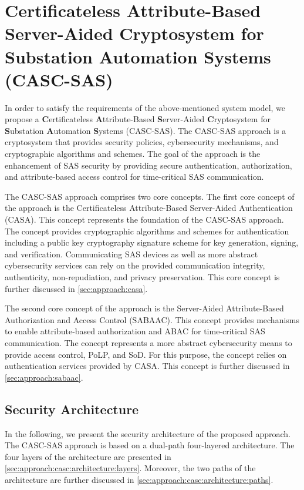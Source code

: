 \section[Certificateless Attribute-Based Server-Aided Cryptosystem for SAS (CASC-SAS)]{Certificateless Attribute-Based Server-Aided Cryptosystem for Substation Automation Systems (CASC-SAS)}
\label{sec:approach:casc}
In order to satisfy the requirements of the above-mentioned system model, we propose a \textbf{C}ertificateless \textbf{A}ttribute-Based \textbf{S}erver-Aided \textbf{C}ryptosystem for \textbf{S}ubstation \textbf{A}utomation \textbf{S}ystems (CASC-SAS).
The CASC-SAS approach is a cryptosystem that provides security policies, cybersecurity mechanisms, and cryptographic algorithms and schemes.
The goal of the approach is the enhancement of SAS security by providing secure authentication, authorization, and attribute-based access control for time-critical SAS communication.

The CASC-SAS approach comprises two core concepts.
The first core concept of the approach is the Certificateless Attribute-Based Server-Aided Authentication (CASA).
This concept represents the foundation of the CASC-SAS approach.
The concept provides cryptographic algorithms and schemes for authentication including a public key cryptography signature scheme for key generation, signing, and verification.
Communicating SAS devices as well as more abstract cybersecurity services can rely on the provided communication integrity, authenticity, non-repudiation, and privacy preservation.
This core concept is further discussed in \autoref{sec:approach:casa}.

The second core concept of the approach is the Server-Aided Attribute-Based Authorization and Access Control (SABAAC).
This concept provides mechanisms to enable attribute-based authorization and ABAC for time-critical SAS communication.
The concept represents a more abstract cybersecurity means to provide access control, PoLP, and SoD.
For this purpose, the concept relies on authentication services provided by CASA.
This concept is further discussed in \autoref{sec:approach:sabaac}.

\subsection{Security Architecture}
In the following, we present the security architecture of the proposed approach.
The CASC-SAS approach is based on a dual-path four-layered architecture.
The four layers of the architecture are presented in \autoref{sec:approach:casc:architecture:layers}.
Moreover, the two paths of the architecture are further discussed in \autoref{sec:approach:casc:architecture:paths}.

